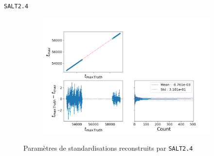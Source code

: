 \documentclass{beamer}
\begin{document}
\begin{frame}{\texttt{SALT2.4}}
\begin{figure}
\begin{subfigure}{0.49\textwidth}
		\includegraphics[width=.8\textwidth]{figures/salt_tmax.png}
	\end{subfigure}
	\caption{Paramètres de standardisations reconstruits par \texttt{SALT2.4}}
\end{figure}
\end{frame}
\end{document}

